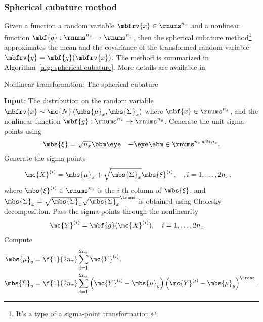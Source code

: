 \subsubsection{Spherical cubature method}
Given a function a random variable $\mbfrv{x}\in\rnums^{n_{x}}$ and a nonlinear function $\mbf{g}:\rnums^{n_{x}}\to\rnums^{n_{y}}$, then the spherical cubature method\footnote{It's a type of a sigma-point transformation.} approximates the mean and the covariance of the transformed random variable $\mbfrv{y}=\mbf{g}(\mbfrv{x})$. The method is summarized in Algorithm~\ref{alg: spherical cubature}. More details are available in \cite[Algorithm~6.8]{sarkkaBayesianFilteringSmoothing2013}


\begin{algorithm}[H]
    \caption{Nonlinear transformation: The spherical cubature}
    \label{alg: spherical cubature}
    \begin{algorithmic}[1]
        \State \textbf{Input}: The distribution on the random variable $\mbfrv{x}\sim\mc{N}\left( \mbs{\mu}_{x},\mbs{\Sigma}_{x} \right)$ where $\mbf{x}\in\rnums^{n_{x}}$, and the nonlinear function $\mbf{g}:\rnums^{n_{x}}\to\rnums^{n_{y}}$.
        \State Generate the unit sigma points using
        \begin{align}
            \mbs{\xi} &= \sqrt{n_{x}} \bbm \eye&-\eye \ebm\in\rnums^{n_{x} \times 2*n_{x}}.
        \end{align}
        \State Generate the sigma points
        \begin{align}
            \mc{X}^{(i)} &= \mbs{\mu}_{x} + \sqrt{\mbs{\Sigma}_{x}}\mbs{\xi}^{(i)}, \quad, i=1,\ldots, 2n_{x},
        \end{align}
        where $\mbs{\xi}^{(i)}\in\rnums^{n_{x}}$ is the $i$-th column of $\mbs{\xi}$, and $\mbs{\Sigma}_{x} = \sqrt{\mbs{\Sigma}_{x}}\sqrt{\mbs{\Sigma}_{x}}^{\trans}$ is obtained using Cholesky decomposition.
        \State Pass the sigma-points through the nonlinearity
        \begin{align}
            \mc{Y}^{(i)} &= \mbf{g}(\mc{X}^{(i)}), \quad i=1, \ldots, 2n_{x}.
        \end{align}
        \State Compute
        \begin{align}
            \mbs{\mu}_{y} &= \f{1}{2n_{x}}\sum_{i=1}^{2n_{x}}\mc{Y}^{(i)},\\
            \mbs{\Sigma}_{y} &= \f{1}{2n_{x}}\sum_{i=1}^{2n_{x}}\left( \mc{Y}^{(i)}-\mbs{\mu}_{y} \right)\left( \mc{Y}^{(i)}-\mbs{\mu}_{y} \right)^{\trans}.
        \end{align}
    \end{algorithmic}
\end{algorithm}

